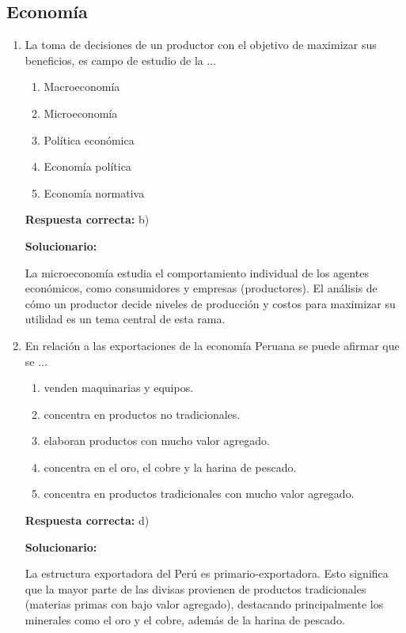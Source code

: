 \vspace{6mm}


\subsection*{Economía}

\begin{enumerate}[resume]
	
	\item La toma de decisiones de un productor con el objetivo de maximizar sus beneficios, es campo de estudio de la ...
	
	\begin{enumerate}[label=\alph*)]
		\item Macroeconomía
		\item Microeconomía
		\item Política económica
		\item Economía política
		\item Economía normativa
	\end{enumerate}
	
	\textbf{Respuesta correcta:} b)
	
	\vspace{2mm}
	\textbf{Solucionario:}
	
	La microeconomía estudia el comportamiento individual de los agentes económicos, como consumidores y empresas (productores). El análisis de cómo un productor decide niveles de producción y costos para maximizar su utilidad es un tema central de esta rama.
	
	\vspace{6mm}
	
	\item En relación a las exportaciones de la economía Peruana se puede afirmar que se ...
	
	\begin{enumerate}[label=\alph*)]
		\item venden maquinarias y equipos.
		\item concentra en productos no tradicionales.
		\item elaboran productos con mucho valor agregado.
		\item concentra en el oro, el cobre y la harina de pescado.
		\item concentra en productos tradicionales con mucho valor agregado.
	\end{enumerate}
	
	\textbf{Respuesta correcta:} d)
	
	\vspace{2mm}
	\textbf{Solucionario:}
	
	La estructura exportadora del Perú es primario-exportadora. Esto significa que la mayor parte de las divisas provienen de productos tradicionales (materias primas con bajo valor agregado), destacando principalmente los minerales como el oro y el cobre, además de la harina de pescado.
	
	\vspace{6mm}
	
\end{enumerate}


